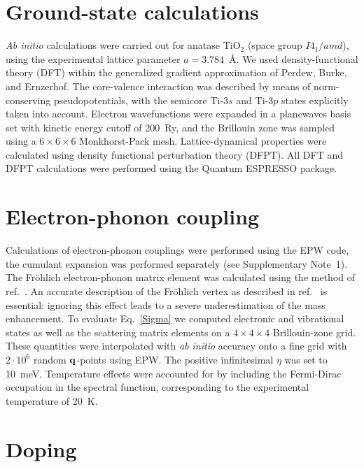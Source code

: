 \documentclass[12pt]{nature}
\def\bq{{\bf q}}
\begin{document}
\section*{\textsf{\small Ground-state calculations}} \vspace*{-10pt}

{\it Ab initio} calculations were carried out for anatase TiO$_2$ (space group $I4_1/amd$), using
the experimental lattice parameter $a=3.784$~\AA\cite{Horn1972}. We used density-functional theory
(DFT) within the generalized gradient approximation of Perdew, Burke, and Ernzerhof\cite{PBE1996}.
The core-valence interaction was described by means of norm-conserving pseudopotentials, with the
semicore Ti-$3s$ and Ti-$3p$ states explicitly taken into account. Electron wavefunctions were
expanded in a planewaves basis set with kinetic energy cutoff of 200~Ry, and the Brillouin zone
was sampled using a $6\times6\times6$ Monkhorst-Pack mesh. Lattice-dynamical properties were
calculated using  density functional perturbation theory (DFPT). All DFT and DFPT calculations 
were performed using the Quantum ESPRESSO\cite{QuantumEspresso} package.

\section*{\textsf{\small Electron-phonon coupling}} \vspace*{-10pt}

Calculations of electron-phonon couplings were performed using the EPW code\cite{EPW2016},
the cumulant expansion was performed separately (see Supplementary Note~1). The Fr\"ohlich electron-phonon 
matrix element was calculated using the method of ref.~. An accurate description of 
the Fr\"ohlich vertex as described in ref.~ is essential: ignoring this effect leads 
to a severe underestimation of the mass enhancement\cite{Zhukov2014}. To evaluate Eq.~\eqref{Sigma} 
we computed electronic and vibrational states as well as the scattering matrix elements on a 
$4\times4\times4$ Brillouin-zone grid. These quantities were interpolated with \textit{ab initio} 
accuracy onto a fine grid with $2\cdot10^6$ random $\bq$-points using EPW. The positive 
infinitesimal $\eta$ was set to 10~meV. Temperature effects were accounted for by including the 
Fermi-Dirac occupation in the spectral function, corresponding to the experimental temperature of 20~K.

\section*{\textsf{\small Doping}} \vspace*{-10pt}
\end{document}
